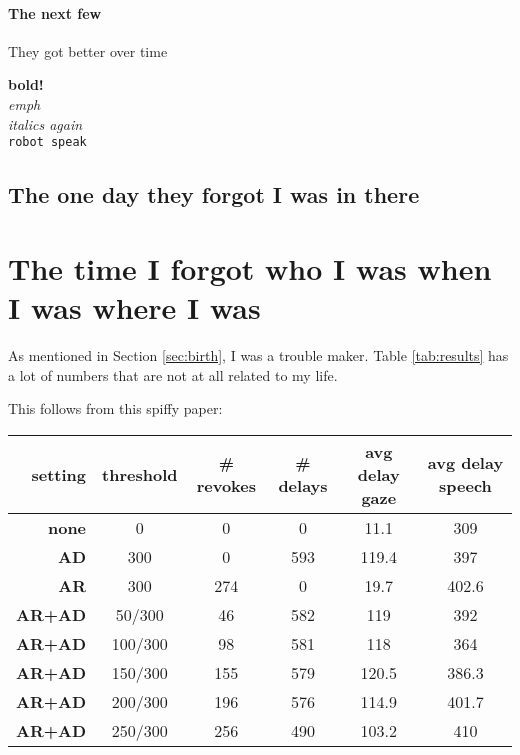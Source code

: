 \documentclass[a4paper,10pt]{article}
\begin{document}
  \paragraph{The next few} They got better over time

  \textbf{bold!}\\
  \emph{emph}\\
  \textit{italics again}\\
  \texttt{robot speak}


  \subsection{The one day they forgot I was in there}

  \section{The time I forgot who I was when I was where I was}
  \label{sec:forgot}

  As mentioned in Section \ref{sec:birth}, I was a trouble maker. Table \ref{tab:results} has a lot of numbers that are not at all related to my life.

  This follows from this spiffy paper: \cite{Schlangen2009}

\begin{table*}[ht]
\centering
\small
 \begin{tabular}{r|c|c|c|c|c}
\hline
\textbf{setting} & \textbf{threshold} &  \textbf{\# revokes} & \textbf{\# delays} & \textbf{avg delay gaze} & \textbf{avg delay speech}\\
\hline
\textbf{none}  & 0      & 0   & 0 & 11.1 & 309   \\
\textbf{AD}    & 300     & 0   & 593 & 119.4 & 397   \\
\textbf{AR}    & 300     & 274 & 0 & 19.7 & 402.6  \\
\textbf{AR+AD} & 50/300   & 46  & 582 & 119 & 392\\
\textbf{AR+AD} & 100/300  & 98  & 581 & 118 & 364\\
\textbf{AR+AD} & 150/300 & 155 & 579 & 120.5 & 386.3 \\
\textbf{AR+AD} & 200/300 & 196 & 576 & 114.9 & 401.7 \\
\textbf{AR+AD} & 250/300  & 256 & 490 & 103.2 & 410 \\
\end{tabular}
\caption{Numbers and schutff}
\label{tab:results}
\end{table*}

%


\end{document}
